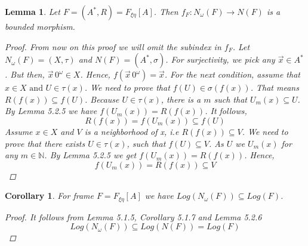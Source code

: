 \documentclass[12pt, a4paper]{scrartcl}
\newtheorem{lemma}[definition]{Lemma}
\newtheorem{corollary}[definition]{Corollary}
\begin{document}
\begin{lemma}
    Let $F =(A^*,R) = F_{\xi \eta}[A]$. Then $f_F : N_\omega(F) \rightarrow N(F)$ is a bounded morphism.

    \begin{proof}
        From now on this proof we will omit the subindex in $f_F$.
        Let $N_\omega(F) = (X, \tau)$ and $N(F) =(A^*, \sigma)$. \newline For surjectivity, we pick any $\vec{x} \in A^*$. But then, $\vec{x}\,0^\omega \in X$. Hence, $f(\vec{x}\, 0^\omega) = \vec{x}$. \newline 
        For the next condition, assume that $x \in X \mbox{ and } U \in \tau(x)$. We need to prove that $f(U) \in \sigma(f(x))$. That means $R(f(x)) \subseteq f(U)$. Because $U \in \tau(x)$, there is a $m$ such that
        $U_m(x) \subseteq U$. By Lemma 5.2.5 we have $f(U_m(x)) = R(f(x))$. It follows, 
        $$R(f(x)) = f(U_m(x)) \subseteq f(U)$$ 
        \newline
        Assume $x\in X$ and $V$ is a neighborhood of x, i.e $R(f(x)) \subseteq V$. We need to prove that there exists $U \in \tau(x)$, such that $f(U)\subseteq V$.
        As $U$ we $U_m(x)$ for any $m \in \mathbb{N}$. By Lemma 5.2.5 we get $f(U_m(x)) = R(f(x))$. Hence, 
        $$f(U_m(x)) = R(f(x)) \subseteq V$$

    \end{proof} 
\end{lemma}

\begin{corollary}
    For frame $F = F_{\xi \eta}[A]$ we have $Log(N_\omega(F)) \subseteq Log(F)$.
    \begin{proof}
        It follows from Lemma 5.1.5, Corollary 5.1.7 and Lemma 5.2.6 
        $$Log(N_\omega(F)) \subseteq Log(N(F)) = Log(F)$$
    \end{proof}

\end{corollary}
\end{document}
